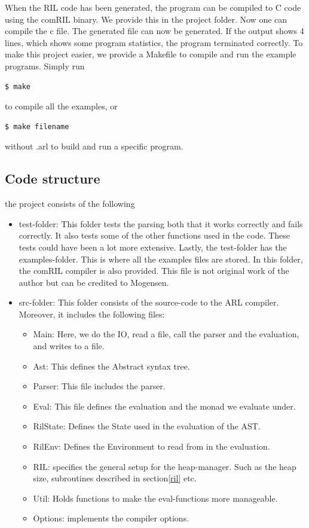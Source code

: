 \documentclass[a4paper]{article}
\begin{document}
When the RIL code has been generated, the program can be compiled to C code using the comRIL binary. We provide this in the project folder. Now one can compile the c file. The generated file can now be generated. If the output shows 4 lines, which shows some program statistics, the program terminated correctly. To make this project easier, we provide a Makefile to compile and run the example programs. Simply run
\begin{verbatim}
$ make
\end{verbatim}
to compile all the examples, or

\begin{verbatim}
$ make filename
\end{verbatim}
without .arl to build and run a specific program.
\subsection{Code structure}
\label{sec:orgde6f82f}
the project consists of the following
\begin{itemize}
\item test-folder: This folder tests the parsing both that it works correctly and fails correctly. It also tests some of the other functions used in the code. These tests could have been a lot more extensive. Lastly, the test-folder has the examples-folder. This is where all the examples files are stored. In this folder, the comRIL compiler is also provided. This file is not original work of the author but can be credited to Mogensen.
\item src-folder: This folder consists of the source-code to the ARL compiler. Moreover, it includes the following files:
\begin{itemize}
\item Main: Here, we do the IO, read a file, call the parser and the evaluation, and writes to a file.
\item Ast: This defines the Abstract syntax tree.
\item Parser: This file includes the parser.
\item Eval: This file defines the evaluation and the monad we evaluate under.
\item RilState: Defines the State used in the evaluation of the AST.
\item RilEnv:  Defines the Environment to read from in the evaluation.
\item RIL: specifies the general setup for the heap-manager. Such as the heap size, subroutines described in section\ref{ril} etc.
\item Util: Holds functions to make the eval-functions more manageable.
\item Options: implements the compiler options.
\end{itemize}
\end{itemize}
\end{document}
